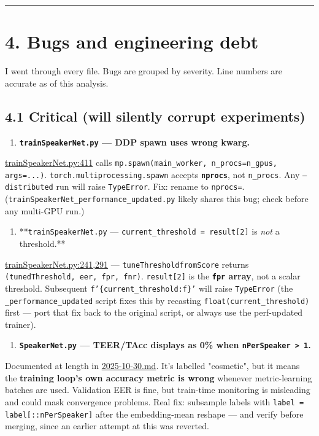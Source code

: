 \documentclass[10pt,a4paper]{article}
\begin{document}
\vspace{0.5em}\hrule\vspace{0.5em}

\section*{4. Bugs and engineering debt}

I went through every file. Bugs are grouped by severity. Line numbers are accurate as of this analysis.

\subsection*{4.1 Critical (will silently corrupt experiments)}

\begin{enumerate}[leftmargin=*,itemsep=2pt]
  \item \textbf{\texttt{trainSpeakerNet.py} --- DDP spawn uses wrong kwarg.}
\end{enumerate}
\href{voxceleb_trainer/trainSpeakerNet.py\#L411}{trainSpeakerNet.py:411} calls \texttt{mp.spawn(main\_worker, n\_procs=n\_gpus, args=...)}. \texttt{torch.multiprocessing.spawn} accepts \textbf{\texttt{nprocs}}, not \texttt{n\_procs}. Any \texttt{--distributed} run will raise \texttt{TypeError}. Fix: rename to \texttt{nprocs=}. (\texttt{trainSpeakerNet\_performance\_updated.py} likely shares this bug; check before any multi-GPU run.)

\begin{enumerate}[leftmargin=*,itemsep=2pt]
  \item **\texttt{trainSpeakerNet.py} --- \texttt{current\_threshold = result[2]} is \textit{not} a threshold.**
\end{enumerate}
\href{voxceleb_trainer/trainSpeakerNet.py\#L241}{trainSpeakerNet.py:241,291} --- \texttt{tuneThresholdfromScore} returns \texttt{(tunedThreshold, eer, fpr, fnr)}. \texttt{result[2]} is the \textbf{\texttt{fpr} array}, not a scalar threshold. Subsequent \texttt{f'\{current\_threshold:f\}'} will raise \texttt{TypeError} (the \texttt{\_performance\_updated} script fixes this by recasting \texttt{float(current\_threshold)} first --- port that fix back to the original script, or always use the perf-updated trainer).

\begin{enumerate}[leftmargin=*,itemsep=2pt]
  \item \textbf{\texttt{SpeakerNet.py} --- TEER/TAcc displays as 0\% when \texttt{nPerSpeaker > 1}.}
\end{enumerate}
Documented at length in \href{voxceleb_trainer/research_logs/2025-10-30.md}{2025-10-30.md}. It's labelled "cosmetic", but it means the \textbf{training loop's own accuracy metric is wrong} whenever metric-learning batches are used. Validation EER is fine, but train-time monitoring is misleading and could mask convergence problems. Real fix: subsample labels with \texttt{label = label[::nPerSpeaker]} after the embedding-mean reshape --- and verify before merging, since an earlier attempt at this was reverted.
\end{document}
